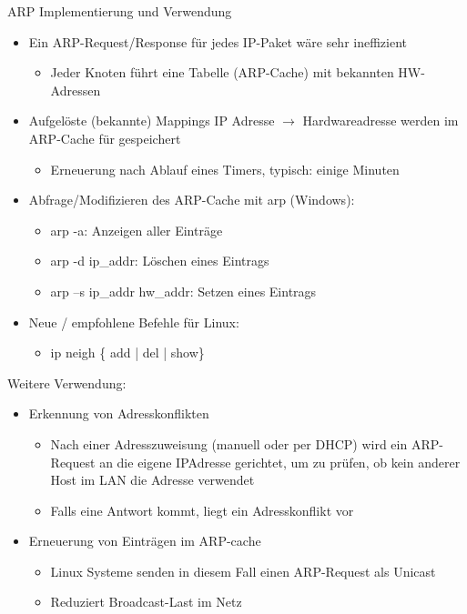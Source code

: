\begin{KR}{ARP Implementierung und Verwendung}
    \begin{itemize}
        \item Ein ARP-Request/Response für jedes IP-Paket wäre sehr ineffizient
        \begin{itemize}
            \item Jeder Knoten führt eine Tabelle (ARP-Cache) mit bekannten HW-Adressen
        \end{itemize}
        \item Aufgelöste (bekannte) Mappings IP Adresse $\rightarrow$ Hardwareadresse werden im ARP-Cache für gespeichert
        \begin{itemize}
            \item Erneuerung nach Ablauf eines Timers, typisch: einige Minuten
        \end{itemize}
        \item Abfrage/Modifizieren des ARP-Cache mit arp (Windows):
        \begin{itemize}
            \item arp -a: Anzeigen aller Einträge
            \item arp -d ip\_addr: Löschen eines Eintrags
            \item arp –s ip\_addr hw\_addr: Setzen eines Eintrags
        \end{itemize}
        \item Neue / empfohlene Befehle für Linux:
        \begin{itemize}
            \item ip neigh \{ add | del | show\}
        \end{itemize}
    \end{itemize}
    Weitere Verwendung:
    \begin{itemize}
        \item Erkennung von Adresskonflikten
        \begin{itemize}
            \item Nach einer Adresszuweisung (manuell oder per DHCP) wird ein ARP-Request an die eigene IPAdresse gerichtet, um zu prüfen, ob kein anderer Host im LAN die Adresse verwendet
            \item Falls eine Antwort kommt, liegt ein Adresskonflikt vor
        \end{itemize}
        \item Erneuerung von Einträgen im ARP-cache
        \begin{itemize}
            \item Linux Systeme senden in diesem Fall einen ARP-Request als Unicast
            \item Reduziert Broadcast-Last im Netz
        \end{itemize}
    \end{itemize}
\end{KR}

